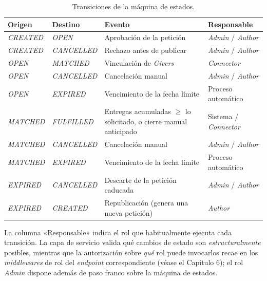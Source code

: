 \documentclass[11pt,oneside,spanish,listoffigures,listoftables]{tfgetsinf}
\begin{document}
\begin{table}[ht]
\centering
\caption[Transiciones de la máquina de estados]{Transiciones de la máquina de estados.}
\label{tab:transiciones}
\footnotesize
\renewcommand{\arraystretch}{1.3}
\begin{tabularx}{\textwidth}{%
  >{\raggedright\arraybackslash}p{2.5cm}%
  >{\raggedright\arraybackslash}p{2.3cm}%
  >{\raggedright\arraybackslash}X%
  >{\raggedright\arraybackslash}p{2.2cm}}
\toprule
\textbf{Origen} & \textbf{Destino} & \textbf{Evento} & \textbf{Responsable} \\
\midrule
\textit{CREATED} & \textit{OPEN} & Aprobación de la petición & \textit{Admin} / \textit{Author} \\
\textit{CREATED} & \textit{CANCELLED} & Rechazo antes de publicar & \textit{Admin} / \textit{Author} \\
\textit{OPEN} & \textit{MATCHED} & Vinculación de \textit{Givers} & \textit{Connector} \\
\textit{OPEN} & \textit{CANCELLED} & Cancelación manual & \textit{Admin} / \textit{Author} \\
\textit{OPEN} & \textit{EXPIRED} & Vencimiento de la fecha límite & Proceso automático \\
\textit{MATCHED} & \textit{FULFILLED} & Entregas acumuladas $\geq$ lo solicitado, o cierre manual anticipado & Sistema / \textit{Connector} \\
\textit{MATCHED} & \textit{CANCELLED} & Cancelación manual & \textit{Admin} / \textit{Author} \\
\textit{MATCHED} & \textit{EXPIRED} & Vencimiento de la fecha límite & Proceso automático \\
\textit{EXPIRED} & \textit{CANCELLED} & Descarte de la petición caducada & \textit{Admin} / \textit{Author} \\
\textit{EXPIRED} & \textit{CREATED} & Republicación (genera una nueva petición) & \textit{Author} \\
\bottomrule
\end{tabularx}

\vspace{0.4em}
{\footnotesize La columna «Responsable» indica el rol que habitualmente ejecuta cada transición. La capa de servicio valida qué cambios de estado son \textit{estructuralmente} posibles, mientras que la autorización sobre \textit{qué} rol puede invocarlos recae en los \textit{middlewares} de rol del \textit{endpoint} correspondiente (véase el Capítulo 6); el rol \textit{Admin} dispone además de paso franco sobre la máquina de estados.}
\end{table}
\end{document}
